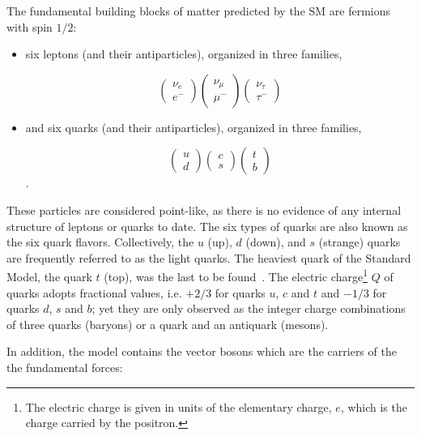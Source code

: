 The fundamental building blocks of matter predicted by the SM are fermions with spin $1/2$:

\begin{itemize}\addtolength{\itemsep}{-0.4\baselineskip}
\item
six leptons (and their antiparticles), organized in three families, 

\[ \left( \begin{array}{c} \nu_e \\ e^- \end{array} \right)  \left( \begin{array}{c} \nu_{\mu} \\ \mu^- \end{array} \right)   \left( \begin{array}{c} \nu_{\tau} \\ \tau^- \end{array} \right)     \]


\item
and six quarks (and their antiparticles), organized in three families,

\[ \left( \begin{array}{c} u \\ d \end{array} \right)  \left( \begin{array}{c} c \\ s \end{array} \right)   \left( \begin{array}{c} t \\ b \end{array} \right)     \].
\end{itemize}
These particles are considered point-like, as there is no evidence of any internal structure of leptons or quarks to date. The six types of quarks are also known as the six quark flavors. Collectively, the $u$ (up), $d$ (down), and $s$ (strange) quarks are frequently referred to as the light quarks. The heaviest quark of the Standard Model, the quark $t$ (top), was the last to be found~\cite{PhysRevLett.74.2626,PhysRevLett.74.2422}.  The electric charge\footnote{The electric charge is given in units of the elementary charge, $e$, which is the charge carried by the positron.} $Q$ of quarks adopts fractional values, i.e. $+2/3$ for quarks $u$, $c$ and $t$ and $-1/3$ for quarks $d$, $s$ and $b$; yet they are only observed as the integer charge combinations of three quarks (baryons) or a quark and an antiquark (mesons).

In addition, the model contains the vector bosons which are the carriers of the the fundamental forces:

